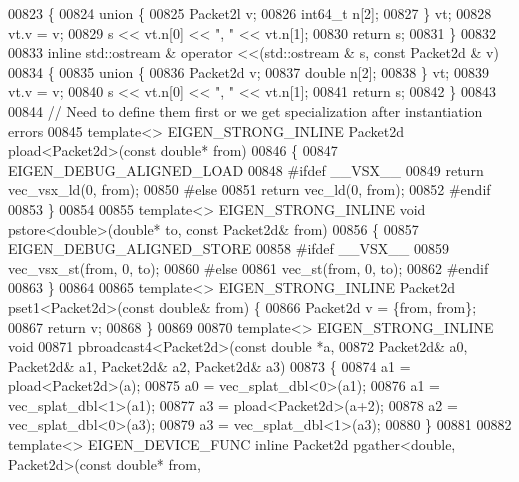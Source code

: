 \begin{DoxyCode}
{00823 \{
00824   \textcolor{keyword}{union }\{
00825     Packet2l   v;
00826     int64\_t n[2];
00827   \} vt;
00828   vt.v = v;
00829   s << vt.n[0] << \textcolor{stringliteral}{", "} << vt.n[1];
00830   \textcolor{keywordflow}{return} s;
00831 \}
00832 
00833 \textcolor{keyword}{inline} std::ostream & operator <<(std::ostream & s, \textcolor{keyword}{const} Packet2d & v)
00834 \{
00835   \textcolor{keyword}{union }\{
00836     Packet2d   v;
00837     \textcolor{keywordtype}{double} n[2];
00838   \} vt;
00839   vt.v = v;
00840   s << vt.n[0] << \textcolor{stringliteral}{", "} << vt.n[1];
00841   \textcolor{keywordflow}{return} s;
00842 \}
00843 
00844 \textcolor{comment}{// Need to define them first or we get specialization after instantiation errors}
00845 \textcolor{keyword}{template}<> EIGEN\_STRONG\_INLINE Packet2d pload<Packet2d>(\textcolor{keyword}{const} \textcolor{keywordtype}{double}* from)
00846 \{
00847   EIGEN\_DEBUG\_ALIGNED\_LOAD
00848 \textcolor{preprocessor}{#ifdef \_\_VSX\_\_}
00849   \textcolor{keywordflow}{return} vec\_vsx\_ld(0, from);
00850 \textcolor{preprocessor}{#else}
00851   \textcolor{keywordflow}{return} vec\_ld(0, from);
00852 \textcolor{preprocessor}{#endif}
00853 \}
00854 
00855 \textcolor{keyword}{template}<> EIGEN\_STRONG\_INLINE \textcolor{keywordtype}{void} pstore<double>(\textcolor{keywordtype}{double}*   to, \textcolor{keyword}{const} Packet2d& from)
00856 \{
00857   EIGEN\_DEBUG\_ALIGNED\_STORE
00858 \textcolor{preprocessor}{#ifdef \_\_VSX\_\_}
00859   vec\_vsx\_st(from, 0, to);
00860 \textcolor{preprocessor}{#else}
00861   vec\_st(from, 0, to);
00862 \textcolor{preprocessor}{#endif}
00863 \}
00864 
00865 \textcolor{keyword}{template}<> EIGEN\_STRONG\_INLINE Packet2d pset1<Packet2d>(\textcolor{keyword}{const} \textcolor{keywordtype}{double}&  from) \{
00866   Packet2d v = \{from, from\};
00867   \textcolor{keywordflow}{return} v;
00868 \}
00869 
00870 \textcolor{keyword}{template}<> EIGEN\_STRONG\_INLINE \textcolor{keywordtype}{void}
00871 pbroadcast4<Packet2d>(\textcolor{keyword}{const} \textcolor{keywordtype}{double} *a,
00872                       Packet2d& a0, Packet2d& a1, Packet2d& a2, Packet2d& a3)
00873 \{
00874   a1 = pload<Packet2d>(a);
00875   a0 = vec\_splat\_dbl<0>(a1);
00876   a1 = vec\_splat\_dbl<1>(a1);
00877   a3 = pload<Packet2d>(a+2);
00878   a2 = vec\_splat\_dbl<0>(a3);
00879   a3 = vec\_splat\_dbl<1>(a3);
00880 \}
00881 
00882 \textcolor{keyword}{template}<> EIGEN\_DEVICE\_FUNC \textcolor{keyword}{inline} Packet2d pgather<double, Packet2d>(\textcolor{keyword}{const} \textcolor{keywordtype}{double}* from, 
}
\end{DoxyCode}
